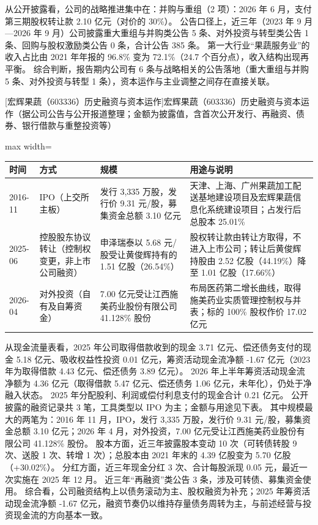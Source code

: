  从公开披露看，公司的战略推进集中在：并购与重组（2 项）：2026 年 6 月，支付第三期股权转让款 2.10 亿元（对价的 30\%）。 公告口径上，近三年（2023 年 9 月---2026 年 9 月）公司披露重大重组与并购类公告 5 条、对外投资与转型类公告 1 条、回购与股权激励类公告 0 条，合计公告 385 条。 第一大行业“果蔬服务业”的收入占比由 2021 年年报的 96.8\% 变为 72.1\%（24.7 个百分点），收入结构出现再平衡。 综合判断，报告期内公司有 6 条与战略相关的公告落地（重大重组与并购 5 条、对外投资与转型 1 条），资本运作与主业调整之间存在直接关联。

\begin{center}\small\setlength{\tabcolsep}{4pt}
[宏辉果蔬（603336）历史融资与资本运作]{宏辉果蔬（603336）历史融资与资本运作（据公司公告与公开报道整理；金额为披露值，含首次公开发行、再融资、债券、银行借款与重整投资等）}
\begin{adjustbox}{max width=\textwidth}
\begin{tabular}{@{}p{1.45cm}p{2.55cm}p{4.05cm}p{4.95cm}@{}}
\toprule
时间 & 方式 & 规模 & 用途与说明 \\
\midrule
2016-11 & IPO（上交所主板） & 发行 3,\allowbreak{}335 万股，\allowbreak{}发行价 9.31 元/\allowbreak{}股，\allowbreak{}募集资金总额 3.10 亿元 & 天津、\allowbreak{}上海、\allowbreak{}广州果蔬加工配送基地建设项目及宏辉果蔬信息化系统建设项目；占发行后总股本 25.01\% \\
2025-06 & 控股股东协议转让（控制权变更，非上市公司融资） & 申泽瑞泰以 5.68 元/\allowbreak{}股受让黄俊辉持有的 1.51 亿股（26.54\%） & 股权转让款由转让方取得，\allowbreak{}不进入上市公司；转让后黄俊辉持股由 2.52 亿股（44.19\%）降至 1.01 亿股（17.66\%） \\
2026-04 & 对外投资（自有及自筹资金） & 7.00 亿元受让江西施美药业股份有限公司 41.128\% 股份 & 布局医药第二增长曲线，\allowbreak{}取得施美药业实质管理控制权与并表；标的 100\% 股权作价 17.02 亿元 \\
\bottomrule
\end{tabular}
\end{adjustbox}
\end{center}

 从现金流量表看，2025 年公司取得借款收到的现金 3.71 亿元、偿还债务支付的现金 5.18 亿元、吸收权益性投资 0.01 亿元，筹资活动现金流净额 -1.67 亿元（2023 年为取得借款 4.43 亿元、偿还债务 3.89 亿元）。 2026 年上半年筹资活动现金流净额为 4.36 亿元（取得借款 5.47 亿元、偿还债务 1.06 亿元，未年化），仍处于净融入状态。 2025 年分配股利、利润或偿付利息支付的现金合计 0.21 亿元。 公开披露的融资记录共 3 笔，工具类型以 IPO 为主；金额与用途见下表。 其中规模最大的两笔为：2016 年 11 月，IPO，发行 3,335 万股，发行价 9.31 元/股，募集资金总额 3.10 亿元；2026 年 4 月，对外投资，7.00 亿元受让江西施美药业股份有限公司 41.128\% 股份。 股本方面，近三年披露股本变动 10 次（可转债转股 9 次、送股 1 次、转增 1 次）；总股本由 2021 年末的 4.39 亿股变为 5.70 亿股（+30.02\%）。 分红方面，近三年现金分红 3 次、合计每股派现 0.05 元，最近一次实施在 2025 年 12 月。 近三年“再融资”类公告 3 条，涉及可转债、募集资金使用。 综合看，公司融资结构上以债务滚动为主、股权融资为补充；2025 年筹资活动现金流净额 -1.67 亿元，融资节奏仍以维持存量债务周转为主，与前述经营与投资现金流的方向基本一致。

